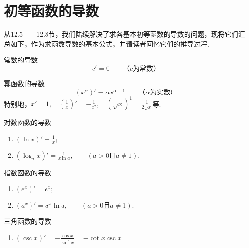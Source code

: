 \section{初等函数的导数}
从12.5——12.8节，我们陆续解决了求各基本初等函数的导数的问题，现将它们汇总如下，作为求函数导数的基本公式，并请读者回忆它们的推导过程.

\begin{thm}{常数的导数}
\[c'=0\qquad \text{（$c$为常数）}\]    
\end{thm}

\begin{thm}
    {幂函数的导数}
\[(x^{\alpha})'=\alpha x^{\alpha-1}\qquad \text{（$\alpha$为实数）}\]
特别地，$x'=1,\quad \left(\frac{1}{x}\right)'=-\frac{1}{x^2},\quad (\sqrt{x})^1=\frac{1}{2\sqrt{x}}$等.
\end{thm}

\begin{thm}
    {对数函数的导数}
\begin{enumerate}[(1)]
\item $(\ln x)' =\frac{1}{x}$;
\item  $( \log _{a}x) '= \frac 1{x\ln a},\qquad ( a> 0\text{且}a\neq1)$.
\end{enumerate}
\end{thm}

\begin{thm}{指数函数的导数}
\begin{enumerate}[(1)]
    \item $( e^x) '= e^x$;
\item $(a^{x})' =a^{x}\ln a,\qquad ( a> 0\text{且} a\neq 1)$.
\end{enumerate}
\end{thm}

\begin{thm}{三角函数的导数}
\begin{enumerate}[(1)]
    \item $\left(\csc x\right)' =-\frac{\cos x}{\sin^{2}x}=-\cot x\csc x$
\end{enumerate}    
\end{thm}

